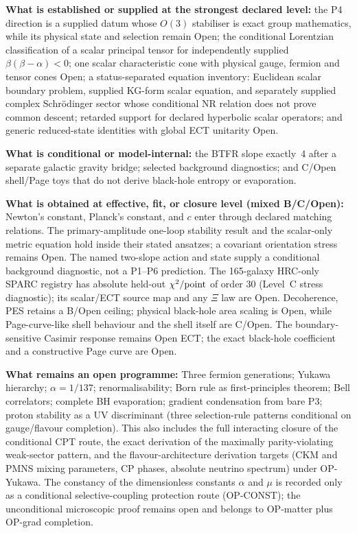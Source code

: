 \documentclass[11pt,a4paper]{article}
\begin{document}
\textbf{What is established or supplied at the strongest declared level:}
the P4 direction is a supplied datum whose $O(3)$ stabiliser is exact group
mathematics, while its physical state and selection remain Open; the conditional Lorentzian
classification of a scalar principal tensor for independently supplied
$\beta(\beta-\alpha)<0$; one scalar characteristic cone with physical gauge, fermion
and tensor cones Open; a status-separated equation inventory: Euclidean scalar boundary problem, supplied KG-form scalar equation, and separately supplied complex Schr\"odinger sector whose conditional NR relation does not prove common descent; retarded support for declared hyperbolic scalar
operators; and generic reduced-state identities with global ECT unitarity
Open.

\textbf{What is conditional or model-internal:}
the BTFR slope exactly~4 after a separate galactic gravity bridge; selected background diagnostics; and C/Open shell/Page toys that do not derive black-hole entropy or evaporation.

\textbf{What is obtained at effective, fit, or closure level (mixed B/C/Open):}
Newton's constant, Planck's constant, and $c$ enter through declared matching
relations.  The primary-amplitude one-loop stability result and the scalar-only
metric equation hold inside their stated ansatzes; a covariant orientation
stress remains Open.  The named two-slope action and state supply a
conditional background diagnostic, not a P1--P6 prediction.  The 165-galaxy HRC-only SPARC registry has absolute held-out $\chi^2/{\rm point}$ of order $30$ (Level~C stress diagnostic); its scalar/ECT source map and any $\Xi$ law are Open.  Decoherence,
PES retains a B/Open ceiling; physical black-hole area scaling is Open,
while Page-curve-like shell behaviour and the shell itself are C/Open.  The
boundary-sensitive Casimir response remains Open ECT;
the exact black-hole coefficient and a constructive Page curve are Open.

\textbf{What remains an open programme:}
Three fermion generations; Yukawa hierarchy; $\alpha = 1/137$; renormalisability; Born rule as first-principles theorem; Bell correlators; complete BH evaporation; gradient condensation from bare P3; proton stability as a UV discriminant (three selection-rule patterns conditional on gauge/flavour completion). This also includes the full interacting closure of the conditional CPT route, the exact derivation of the maximally parity-violating weak-sector pattern, and the flavour-architecture derivation targets (CKM and PMNS mixing parameters, CP phases, absolute neutrino spectrum) under OP-Yukawa. The constancy of the dimensionless constants $\alpha$ and $\mu$ is recorded only as a conditional selective-coupling protection route (OP-CONST); the unconditional microscopic proof remains open and belongs to OP-matter plus OP-grad completion.
\end{document}
